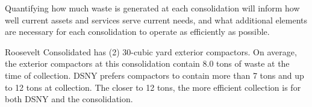 
    Quantifying how much waste is generated at each consolidation will inform how well current assets and services serve current needs, and what additional elements are necessary for each consolidation to operate as efficiently as possible.
    
    Roosevelt Consolidated has (2) 30-cubic yard exterior compactors. On average, the exterior compactors at this consolidation contain 8.0 tons of waste at the time of collection. DSNY prefers compactors to contain more than 7 tons and up to 12 tons at collection. The closer to 12 tons, the more efficient collection is for both DSNY and the consolidation.